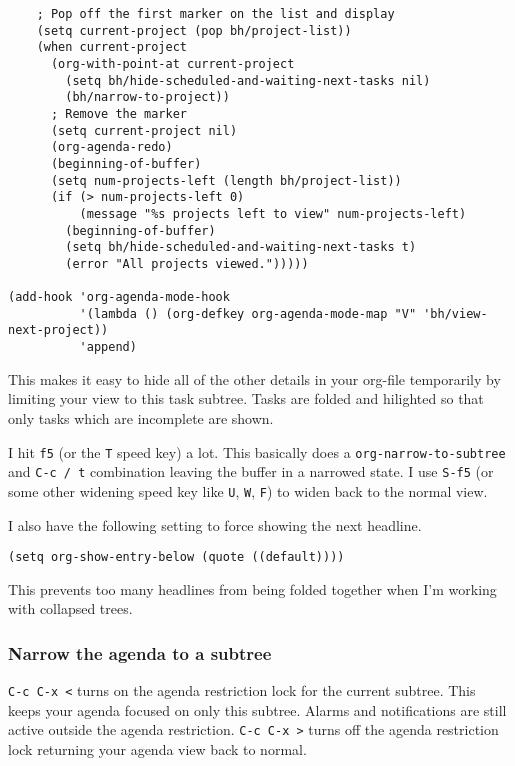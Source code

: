 \documentclass[11pt]{scrartcl}
\begin{document}
\begin{verbatim}
    ; Pop off the first marker on the list and display
    (setq current-project (pop bh/project-list))
    (when current-project
      (org-with-point-at current-project
        (setq bh/hide-scheduled-and-waiting-next-tasks nil)
        (bh/narrow-to-project))
      ; Remove the marker
      (setq current-project nil)
      (org-agenda-redo)
      (beginning-of-buffer)
      (setq num-projects-left (length bh/project-list))
      (if (> num-projects-left 0)
          (message "%s projects left to view" num-projects-left)
        (beginning-of-buffer)
        (setq bh/hide-scheduled-and-waiting-next-tasks t)
        (error "All projects viewed.")))))

(add-hook 'org-agenda-mode-hook
          '(lambda () (org-defkey org-agenda-mode-map "V" 'bh/view-next-project))
          'append)
\end{verbatim}

This makes it easy to hide all of the other details in your org-file
temporarily by limiting your view to this task subtree.  Tasks are
folded and hilighted so that only tasks which are incomplete are
shown.

I hit \texttt{f5} (or the \texttt{T} speed key) a lot.  This basically does a
\texttt{org-narrow-to-subtree} and \texttt{C-c / t} combination leaving the buffer
in a narrowed state.  I use \texttt{S-f5} (or some other widening speed key
like \texttt{U}, \texttt{W}, \texttt{F}) to widen back to the normal view.

I also have the following setting to force showing the next headline.
\begin{verbatim}
(setq org-show-entry-below (quote ((default))))
\end{verbatim}

This prevents too many headlines from being folded together when I'm
working with collapsed trees.

\subsubsection{Narrow the agenda to a subtree}
\label{sec:orgheadline55}
    \texttt{C-c C-x <} turns on the agenda restriction lock for the current
subtree.  This keeps your agenda focused on only this subtree.  Alarms
and notifications are still active outside the agenda restriction.
\texttt{C-c C-x >} turns off the agenda restriction lock returning your
agenda view back to normal.
\end{document}
